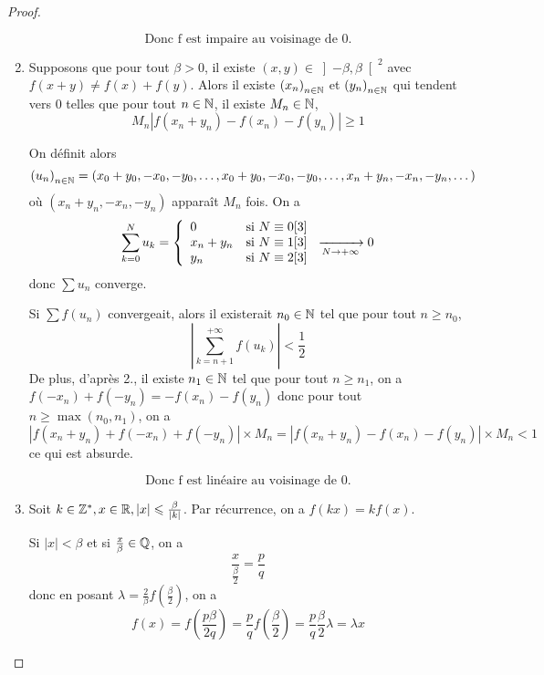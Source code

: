 \begin{proof}
\begin{enumerate}
		$$\boxed{\text{Donc f est impaire au voisinage de 0.}}$$

		\item Supposons que pour tout $\beta>0$, il existe $(x,y)\in\left]-\beta,\beta\right[^{2}$ avec $f\left(x+y\right)\neq f\left(x\right)+f\left(y\right)$. Alors il existe $\left(x_{n}\right)_{n\in\mathbb{N}}$ et $\left(y_{n}\right)_{n\in\mathbb{N}}$ qui tendent vers 0 telles que pour tout $n\in\mathbb{N}$, il existe $M_{n}\in\mathbb{N}$,
		$$M_{n}\left\lvert f\left(x_{n}+y_{n}\right)-f\left(x_{n}\right)-f\left(y_{n}\right)\right\rvert\geqslant 1$$

		On définit alors 
		$$\left(u_{n}\right)_{n\in\mathbb{N}}=\left(x_{0}+y_{0},-x_{0},-y_{0},\dots,x_{0}+y_{0},-x_{0},-y_{0},\dots,x_{n}+y_{n},-x_{n},-y_{n},\dots\right)$$
		où $\left(x_{n}+y_{n},-x_{n},-y_{n}\right)$ apparaît $M_{n}$ fois. On a 
		$$\sum_{k=0}^{N}u_{k}=
		\left\{
			\begin{array}[]{ll}
				0 & \text{si }N\equiv0[3]\\
				x_{n}+y_{n} & \text{si }N\equiv1[3]\\
				y_{n} & \text{si }N\equiv2[3]
			\end{array}
		\right.\xrightarrow[N\to+\infty]{}0
		$$
		donc $\sum u_{n}$ converge.

		Si $\sum f\left(u_{n}\right)$ convergeait, alors il existerait $n_{0}\in\mathbb{N}$ tel que pour tout $n\geqslant n_{0}$, 
		$$\left\lvert\sum_{k=n+1}^{+\infty}f\left(u_{k}\right)\right\rvert<\frac{1}{2}$$
		De plus, d'après 2., il existe $n_{1}\in\mathbb{N}$ tel que pour tout $n\geqslant n_{1}$, on a $f\left(-x_{n}\right)+f\left(-y_{n}\right)=-f\left(x_{n}\right)-f\left(y_{n}\right)$ donc pour tout $n\geqslant\max\left(n_{0},n_{1}\right)$, on a 
		$$\left\lvert f\left(x_{n}+y_{n}\right)+f\left(-x_{n}\right)+f\left(-y_{n}\right)\right\rvert\times M_{n}=\left\lvert f\left(x_{n}+y_{n}\right)-f\left(x_{n}\right)-f\left(y_{n}\right)\right\rvert\times M_{n}<1$$
		ce qui est absurde.

		$$\boxed{\text{Donc f est linéaire au voisinage de 0.}}$$

		\item Soit $k\in\mathbb{Z}^{*},x\in\mathbb{R},\left\lvert x\right\rvert\leqslant\frac{\beta}{\left\lvert k\right\rvert}$. Par récurrence, on a $f\left(kx\right)=kf\left(x\right)$.
		
		Si $\left\lvert x\right\rvert<\beta$ et si $\frac{x}{\beta}\in\mathbb{Q}$, on a 
		$$\frac{x}{\frac{\beta}{2}}=\frac{p}{q}$$
		donc en posant $\lambda=\frac{2}{\beta}f\left(\frac{\beta}{2}\right)$, on a
		$$f\left(x\right)=f\left(\frac{p\beta}{2q}\right)=\frac{p}{q}f\left(\frac{\beta}{2}\right)=\frac{p}{q}\frac{\beta}{2}\lambda=\lambda x$$


\end{enumerate}
\end{proof}
